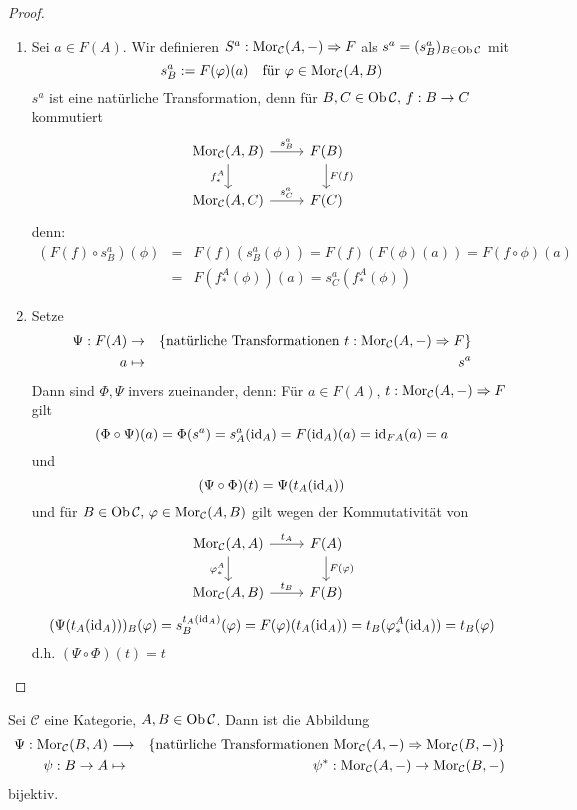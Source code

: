 \begin{proof}
	\begin{enumerate}
		\item Sei $a\in F(A)$. Wir definieren $S^a: \text{Mor}_{\mathcal{C}}(A,-) \Rightarrow F$ als $s^a= (s^a_B)_{B\in \text{Ob}\,\mathcal{C}}$ mit 
		$$s_B^a := F(\varphi)(a) \quad \text{für } \varphi \in \text{Mor}_{\mathcal{C}}(A,B)$$
		$s^a$ ist eine natürliche Transformation, denn für $B,C\in \text{Ob}\,\mathcal{C}, \, f:B \to C$ kommutiert
		$$\begin{tikzcd}
		\Mor_{\mathcal{C}}(A,B) \arrow{r}{s_B^a}\arrow[swap]{d}{f_*^A} & F(B) \arrow{d}{F(f)}\\
		\Mor_{\mathcal{C}}(A,C) \arrow{r}{s_C^a} & F(C)
		\end{tikzcd}$$
		denn:
		\begin{eqnarray*}(F(f) \circ s_B^a)(\phi) &=& F(f) (s_B^a(\phi)) = F(f)(F(\phi)(a)) = F(f\circ \phi)(a) \\
			&=& F(f_*^A(\phi))(a) = s_C^a(f_*^A(\phi))
	\end{eqnarray*}
	\item Setze \begin{eqnarray*}
	\Psi:F(A) &\to& \{\text{natürliche Transformationen }t:\text{Mor}_{\mathcal{C}}(A, -) \Rightarrow F\}\\
	a & \mapsto & s^a
	\end{eqnarray*}
	Dann sind $\Phi, \Psi$ invers zueinander, denn: Für $a\in F(A)$, $t:\text{Mor}_{\mathcal{C}}(A,-) \Rightarrow F$ gilt
	$$(\Phi \circ \Psi)(a) = \Phi(s^a) = s_A^a(\operatorname{id}_A) = F(\operatorname{id}_A)(a) = \operatorname{id}_{FA}(a) = a$$
	und 
	$$(\Psi \circ \Phi)(t) = \Psi(t_A(\operatorname{id}_A))$$
	und für $B\in \text{Ob}\,\mathcal{C}, \, \varphi \in \text{Mor}_{\mathcal{C}}(A,B)$ gilt wegen der Kommutativität von 
	$$\begin{tikzcd}
	\Mor_{\mathcal{C}}(A,A) \arrow{r}{t_A}\arrow[swap]{d}{\phi_*^A} & F(A) \arrow{d}{F(\phi)}\\
	\Mor_{\mathcal{C}}(A,B) \arrow{r}{t_B} & F(B)
	\end{tikzcd}$$
	$$(\Psi(t_A(\operatorname{id}_A)))_B(\varphi) = s^{t_A(\operatorname{id}_A)}_B(\varphi)= F(\varphi)(t_A(\operatorname{id}_A)) = t_B(\varphi_*^A(\operatorname{id}_A)) = t_B(\varphi) $$
	d.h. $(\Psi \circ \Phi)(t) = t$
	\end{enumerate}
\end{proof}
\begin{fo}\label{4.21}	Sei $\mathcal{C}$ eine Kategorie, $A,B \in \text{Ob}\,\mathcal{C}$. Dann ist die Abbildung 
	\begin{eqnarray*}
	 \Psi: \text{Mor}_{\mathcal{C}}(B,A) & \longrightarrow & \{\text{natürliche Transformationen } \text{Mor}_{\mathcal{C}}(A,-) \Rightarrow \text{Mor}_{\mathcal{C}}(B,-) \}\\
	 \psi:B \to A & \mapsto & \psi^*: \text{Mor}_{\mathcal{C}}(A,-) \to \text{Mor}_{\mathcal{C}}(B,-)
 	\end{eqnarray*}
 bijektiv.
\end{fo}
